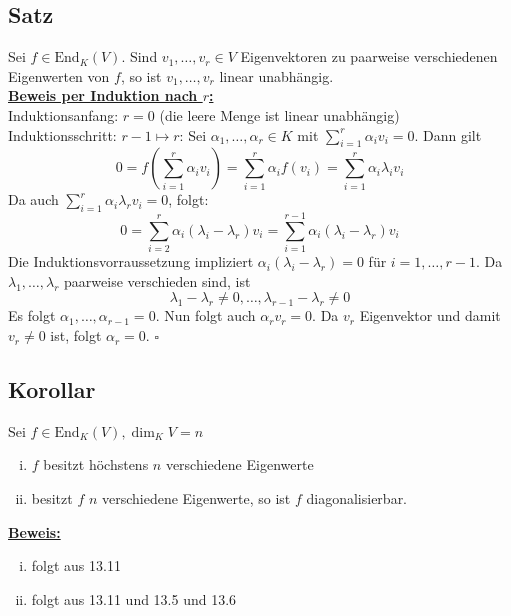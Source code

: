 \subsection{Satz} %
\label{sub:satz}
Sei $f \in \text{End}_K (V)$. Sind $v_1, \ldots , v_r \in V$ Eigenvektoren zu paarweise verschiedenen Eigenwerten von $f$, so ist $v_1, \ldots , v_r$ linear unabhängig.
\vspace{10pt} \\
\underline{\textbf{Beweis per Induktion nach $r$:}} \\
Induktionsanfang: $r=0$ (die leere Menge ist linear unabhängig)
\vspace{7pt} \\
Induktionsschritt: $r-1 \mapsto r$:
Sei $\alpha_1, \ldots , \alpha_r \in K$ mit $\sum_{i=1}^{r} \alpha_i v_i = 0$. Dann gilt
\[
	0= f \left( \sum_{i=1}^{r} \alpha_i v_i \right) = \sum_{i=1}^{r} \alpha_i f(v_i)= \sum_{i=1}^{r} \alpha_i \lambda_i v_i  
\]
Da auch $\sum_{i=1}^{r} \alpha_i \lambda_r v_i = 0 $, folgt:
\[
	0 = \sum\limits_{i=2}^{r} \alpha_i (\lambda_i - \lambda_r) v_i = \sum\limits_{i=1}^{r-1} \alpha_i (\lambda_i - \lambda_r) v_i
\]
Die Induktionsvorraussetzung impliziert $\alpha_i (\lambda_i - \lambda_r)=0$ für $i= 1, \ldots , r-1$.
Da $\lambda_1, \ldots , \lambda_r$ paarweise verschieden sind, ist 
\[
	\lambda_1 - \lambda_r \not= 0 , \ldots , \lambda_{r-1} - \lambda_r \not= 0
\]
Es folgt $\alpha_1, \ldots , \alpha_{r-1} = 0$. 
Nun folgt auch $\alpha_r v_r = 0$. 
Da $v_r$ Eigenvektor und damit $v_r \not= 0 $ ist, folgt $\alpha_r = 0$. \hfill \( \square \)

\subsection{Korollar} %
\label{sub:korollar}
Sei $f \in \text{End}_K (V), \dim_K V = n$
\begin{enumerate}[(i)]
	\item $f$ besitzt höchstens $n$ verschiedene Eigenwerte
	\item besitzt $f$ $n$ verschiedene Eigenwerte, so ist $f$ diagonalisierbar.
\end{enumerate}
\underline{\textbf{Beweis:}} 
\begin{enumerate}[(i)]
	\item folgt aus 13.11
	\item folgt aus 13.11 und 13.5 und 13.6
\end{enumerate}

